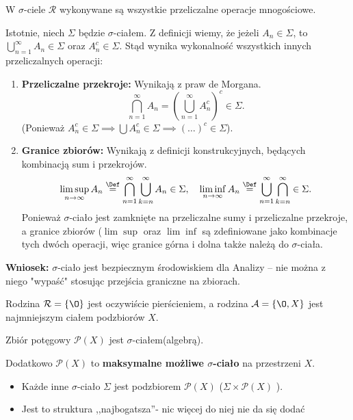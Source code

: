 \begin{remark}
    W $\sigma$-ciele $\mathcal{R}$ wykonywane są wszystkie przeliczalne operacje mnogościowe.
    
    Istotnie, niech $\Sigma$ będzie $\sigma$-ciałem. Z definicji wiemy, że jeżeli $A_n \in \Sigma$, to $\bigcup_{n=1}^\infty A_n \in \Sigma$ oraz $A_n^c \in \Sigma$.
    Stąd wynika wykonalność wszystkich innych przeliczalnych operacji:
    
    \begin{enumerate}
        \item \textbf{Przeliczalne przekroje:} Wynikają z praw de Morgana.
        \[
            \bigcap_{n=1}^{\infty} A_n = \left( \bigcup_{n=1}^{\infty} A_n^c \right)^c \in \Sigma.
        \]
        (Ponieważ $A_n^c \in \Sigma \implies \bigcup A_n^c \in \Sigma \implies (\dots)^c \in \Sigma$).
        
        \item \textbf{Granice zbiorów:} Wynikają z definicji konstrukcyjnych, będących kombinacją sum i przekrojów.
        \[
            \limsup_{n \to \infty} A_n \overset{\Def}{=} \bigcap_{n=1}^{\infty}\bigcup_{k=n}^{\infty}A_{n}  \in \Sigma, \quad
            \liminf_{n \to \infty} A_n \overset{\Def}{=}\bigcup_{n=1}^{\infty}\bigcap_{k=n} ^{\infty}  \in \Sigma.
        \]
	Ponieważ $\sigma$-ciało jest zamknięte na przeliczalne sumy i przeliczalne przekroje, a granice zbiorów ($\lim\sup$ oraz $\lim\inf$ są zdefiniowane jako kombinacje tych dwóch operacji, więc granice górna i dolna także należą do $\sigma$-ciała.
    \end{enumerate}
    \textbf{Wniosek:} $\sigma$-ciało jest bezpiecznym środowiskiem dla Analizy – nie można z niego "wypaść" stosując przejścia graniczne na zbiorach.
\end{remark}
\begin{eg}
	Rodzina $\mathcal{R}=\{\O\} $ jest oczywiście pierścieniem, a rodzina $\mathcal{A}=\{\O, X\} $ jest najmniejszym ciałem podzbiorów $X$.
\end{eg} 
\begin{eg}
	Zbiór potęgowy $\mathcal{P}(X) $ jest $\sigma$-ciałem(algebrą).

	Dodatkowo $\mathcal{P}(X) $ to \textbf{maksymalne możliwe $\sigma$-ciało} na przestrzeni $X$.
	\begin{itemize}
		\item Każde inne $\sigma$-ciało $\Sigma$ jest podzbiorem $\mathcal{P}(X) $ ($\Sigma \times \mathcal{P}(X) $ ).
		\item Jest to struktura ,,najbogatsza''- nic więcej do niej nie da się dodać
	\end{itemize}
\end{eg} 
